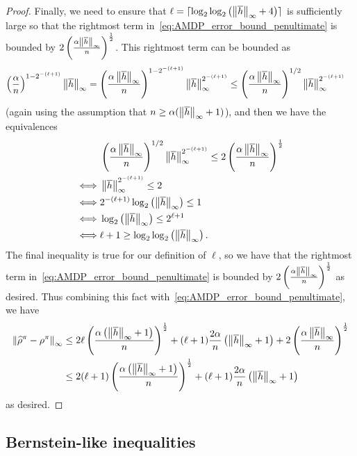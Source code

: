 \documentclass{article}
\theoremstyle{plain}
\theoremstyle{plain}
\theoremstyle{remark}
\theoremstyle{plain}
\theoremstyle{plain}
\newcommand{\hc}{\overline{h}}
\newcommand{\rhohat}{\widehat{\rho}}
\begin{document}
\begin{proof}
Finally, we need to ensure that $\ell = \lceil\log_2 \log_2 \left( \infnorm{\hc} + 4\right) \rceil$ is sufficiently large so that the rightmost term in~\eqref{eq:AMDP_error_bound_penultimate} is bounded by $2\left(\frac{\alpha \infnorm{\hc}}{n} \right)^{ \frac{1}{2}}$. This rightmost term can be bounded as
\begin{align*}
    \left(\frac{\alpha}{n}\right)^{1-2^{-(\ell+1)}}  \infnorm{\hc} &= \left(\frac{\alpha \infnorm{\hc} }{n}\right)^{1-2^{-(\ell+1)}}  \infnorm{\hc}^{2^{-(\ell+1)}} 
    \leq \left(\frac{\alpha \infnorm{\hc} }{n}\right)^{1/2}  \infnorm{\hc}^{2^{-(\ell+1)}}
\end{align*}
(again using the assumption that $n \geq \alpha (\infnorm{\hc} + 1)$), and then we have the equivalences
\begin{align*}
    &\left(\frac{\alpha \infnorm{\hc} }{n}\right)^{1/2}  \infnorm{\hc}^{2^{-(\ell+1)}}
    \leq 2\left(\frac{\alpha \infnorm{\hc}}{n} \right)^{ \frac{1}{2}} \\
    \iff & \infnorm{\hc}^{2^{-(\ell+1)}}  \leq 2 \\
    \iff & 2^{-(\ell+1)} \log_2 \left( \infnorm{\hc} \right)  \leq 1 \\
    \iff & \log_2 \left( \infnorm{\hc} \right) \leq 2^{\ell + 1} \\
    \iff & \ell + 1 \geq \log_2 \log_2 \left( \infnorm{\hc} \right).
\end{align*}
The final inequality is true for our definition of $\ell$, so we have that the rightmost term in~\eqref{eq:AMDP_error_bound_penultimate} is bounded by $2\left(\frac{\alpha \infnorm{\hc}}{n} \right)^{ \frac{1}{2}}$ as desired. Thus combining this fact with~\eqref{eq:AMDP_error_bound_penultimate}, we have
\begin{align*}
    \infnorm{\rhohat^\pi - \rho^\pi} & \leq  2 \ell \left(\frac{\alpha \left(\infnorm{\hc} + 1\right)}{n} \right)^{ \frac{1}{2}}+ (\ell+1) \frac{2\alpha   }{n}\left(\infnorm{\hc} + 1 \right)  +   2\left(\frac{\alpha \infnorm{\hc}}{n} \right)^{ \frac{1}{2}} \\
    & \leq 2 (\ell + 1) \left(\frac{\alpha \left(\infnorm{\hc} + 1\right)}{n} \right)^{ \frac{1}{2}}+ (\ell+1) \frac{2\alpha   }{n}\left(\infnorm{\hc} + 1 \right)
\end{align*}
as desired.
\end{proof}

\subsection{Bernstein-like inequalities}
\label{sec:AMDP_bernstein_bounds}
\end{document}
